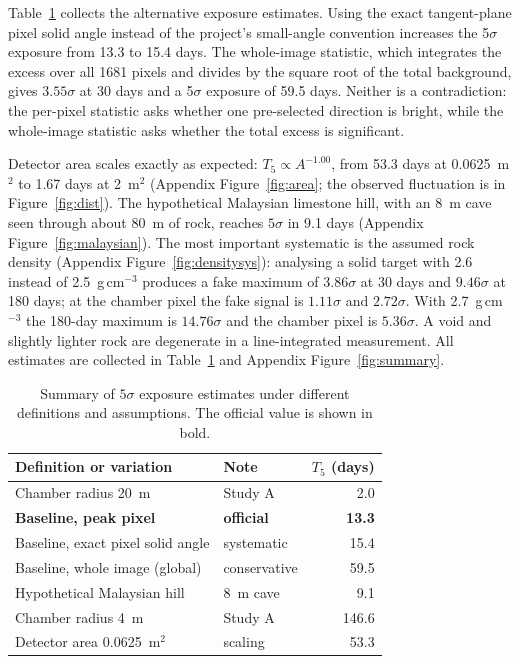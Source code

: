 \documentclass{article}
\begin{document}
Table~\ref{tab:summary} collects the alternative exposure estimates. Using the
exact tangent-plane pixel solid angle instead of the project's small-angle
convention increases the 5$\sigma$ exposure from 13.3 to 15.4 days. The
whole-image statistic, which integrates the excess over all 1681 pixels and
divides by the square root of the total background, gives $3.55\sigma$ at
30 days and a 5$\sigma$ exposure of 59.5 days. Neither is a contradiction: the
per-pixel statistic asks whether one pre-selected direction is bright, while
the whole-image statistic asks whether the total excess is significant.

Detector area scales exactly as expected: $T_5\propto A^{-1.00}$, from
53.3 days at 0.0625~m$^2$ to 1.67 days at 2~m$^2$ (Appendix
Figure~\ref{fig:area}; the observed fluctuation is in
Figure~\ref{fig:dist}). The hypothetical Malaysian limestone hill, with an 8~m
cave seen through about 80~m of rock, reaches $5\sigma$ in 9.1 days (Appendix
Figure~\ref{fig:malaysian}). The most important systematic is the assumed rock
density (Appendix Figure~\ref{fig:densitysys}): analysing a solid target with
2.6 instead of 2.5~g\,cm$^{-3}$ produces a fake maximum of $3.86\sigma$ at
30 days and $9.46\sigma$ at 180 days; at the chamber pixel the fake signal is
$1.11\sigma$ and $2.72\sigma$. With 2.7~g\,cm$^{-3}$ the 180-day maximum is
$14.76\sigma$ and the chamber pixel is $5.36\sigma$. A void and slightly
lighter rock are degenerate in a line-integrated measurement. All estimates are
collected in Table~\ref{tab:summary} and Appendix Figure~\ref{fig:summary}.

\begin{table}[t]
\centering
\caption{Summary of $5\sigma$ exposure estimates under different definitions
and assumptions. The official value is shown in bold.}
\label{tab:summary}
\small
\begin{tabular}{@{}llr@{}}
\toprule
Definition or variation & Note & $T_5$ (days) \\
\midrule
Chamber radius 20~m & Study A & 2.0 \\
\textbf{Baseline, peak pixel} & \textbf{official} & \textbf{13.3} \\
Baseline, exact pixel solid angle & systematic & 15.4 \\
Baseline, whole image (global) & conservative & 59.5 \\
Hypothetical Malaysian hill & 8~m cave & 9.1 \\
Chamber radius 4~m & Study A & 146.6 \\
Detector area 0.0625~m$^2$ & scaling & 53.3 \\
\bottomrule
\end{tabular}
\end{table}
\end{document}
